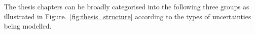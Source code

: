 The thesis chapters can be broadly categorised into the following three groups as illustrated in Figure.~\ref{fig:thesis_structure} according to the types of uncertainties being modelled. 

%
%


